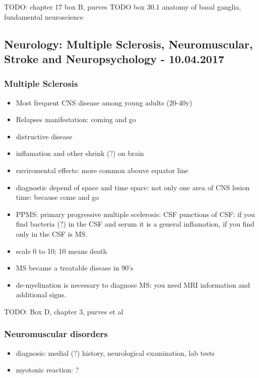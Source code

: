 \documentclass[12pt,article,oneside,a4paper]{memoir}
\begin{document}
TODO: chapter 17 box B, purves
TODO box 30.1 anatomy of basal ganglia, fundamental neuroscience

\newpage
\subsection{Neurology: Multiple Sclerosis, Neuromuscular, Stroke and Neuropsychology - 10.04.2017}

\subsubsection{Multiple Sclerosis}
\begin{itemize}
\item Most frequent CNS disease among young adults (20-40y)
\item Relapses manifestation: coming and go
\item distructive disease
\item inflamation and other shrink (?) on brain
\item enviromental effects: more common abouve equator line
\item diagnostic depend of space and time
\subitem space: not only one area of CNS lesion
\subitem time: because come and go
\item PPMS: primary progressive multiple scelerosis: CSF
\subitem punctions of CSF: if you find bacteria (?) in the CSF and serum it is a general inflamation, if you find only in the CSF is MS.
\item scale 0 to 10; 10 means death
\item MS became a treatable disease in 90's
\item de-myelination is necessary to diagnose MS: you need MRI information and additional signs.
\end{itemize}

TODO: Box D, chapter 3, purves et al

\subsubsection{Neuromuscular disorders}
\begin{itemize}
\item diagnosis: medial (?) history, neurological examination, lab tests
\item myotonic reaction: ?
\end{itemize}
\end{document}
